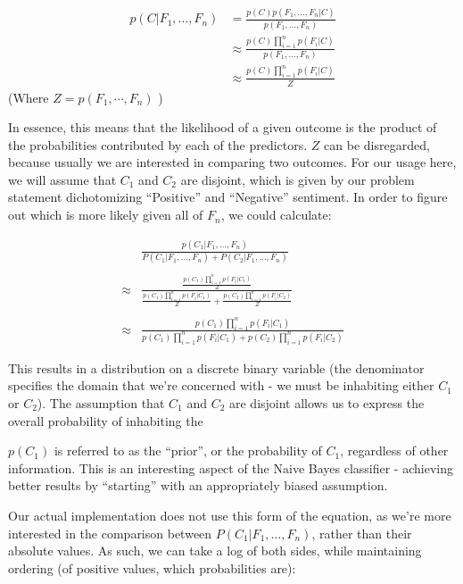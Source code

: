 \documentclass[12pt,a4paper]{article}
\begin{document}
\begin{align*}
p(C \vert F_1,\dots,F_n) & = \frac{p(C) p(F_1,\dots,F_n\vert C)}{p(F_1,\dots,F_n)}    \\
                         & \approx \frac{p(C) \prod_{i=1}^n p(F_i \vert C)}{p(F_1,\dots,F_n)} \\
                         & \approx \frac{p(C) \prod_{i=1}^n p(F_i \vert C)}{Z}
\end{align*}
(Where $ Z = p(F_1,\cdots,F_n) $ )

In essence, this means that the likelihood of a given outcome is the product of the probabilities contributed by each of the predictors.  $ Z $ can be disregarded, because usually we are interested in comparing two outcomes.  For our usage here, we will assume that $ C_1 $ and $ C_2 $ are disjoint, which is given by our problem statement dichotomizing ``Positive'' and ``Negative'' sentiment.  In order to figure out which is more likely given all of $F_n$, we could calculate:

\begin{align*}
  & \frac{ p(C_1 \vert F_1,\dots,F_n) } { P(C_1 \vert F_1,\dots,F_n) + P(C_2 \vert F_1,\dots,F_n) } \\
  & \\
  \approx & \frac{\frac{p(C_1) \prod_{i=1}^n p(F_i \vert C_1)}{Z}}{\frac{p(C_1) \prod_{i=1}^n p(F_i \vert C_1)}{Z} + \frac{p(C_2) \prod_{i=1}^n p(F_i \vert C_2)}{Z}} \\
  & \\
  \approx & \frac{p(C_1) \prod_{i=1}^n p(F_i \vert C_1)}{p(C_1) \prod_{i=1}^n p(F_i \vert C_1) + p(C_2) \prod_{i=1}^n p(F_i \vert C_2)}
\end{align*}

This results in a distribution on a discrete binary variable (the denominator specifies the domain that we're concerned with - we must be inhabiting either $ C_1 $ or $ C_2 $).  The assumption that $ C_1 $ and $ C_2 $ are disjoint allows us to express the overall probability of inhabiting the 

$ p(C_1) $ is referred to as the ``prior'', or the probability of $ C_1 $, regardless of other information.  This is an interesting aspect of the Naive Bayes classifier - achieving better results by ``starting'' with an appropriately biased assumption.

Our actual implementation does not use this form of the equation, as we're more interested in the comparison between $ P(C_1 \vert F_1,\dots,F_n) $, rather than their absolute values.  As such, we can take a log of both sides, while maintaining ordering (of positive values, which probabilities are):
\end{document}
